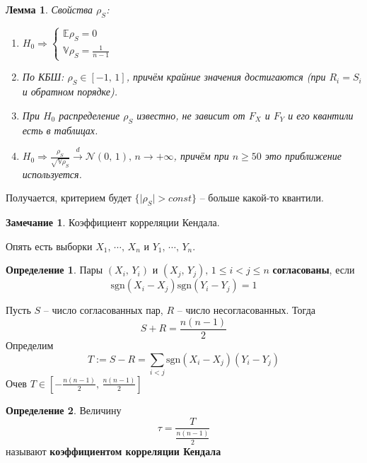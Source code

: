 \documentclass[a4paper,12pt]{article}
\renewcommand{\leq}{\ensuremath{\leqslant}}
\renewcommand{\geq}{\ensuremath{\geqslant}}
\theoremstyle{plain}
\newtheorem{lemma}{Лемма}[section]
\theoremstyle{definition}
\newtheorem{definition}{Определение}[section]
\newtheorem*{note}{Замечание}
\theoremstyle{remark}
\begin{document}
\begin{lemma}
  Свойства $\rho_S$:
  \begin{enumerate}
    \item $H_0 \Rightarrow \begin{cases}
      \mathbb{E}\rho_S = 0\\
      \mathbb{V}\rho_S = \frac{1}{n - 1}
    \end{cases}$
    \item По КБШ: $\rho_S \in [-1,\,1]$, причём крайние значения достигаются (при $R_i = S_i$ и обратном порядке).
    \item При $H_0$ распределение $\rho_S$ известно, не зависит от $F_X$ и $F_Y$ и его квантили есть в таблицах.
    \item $H_0 \Rightarrow \frac{\rho_S}{\sqrt{\mathbb{V}\rho_S}} \overset{d}{\to} \mathcal{N}(0,\,1),\, n \to +\infty$, причём при $n \geq 50$ это приближение используется.
  \end{enumerate}
\end{lemma}

Получается, критерием будет $\{\vert \rho_S\vert > const\}$ -- больше какой-то квантили.

\begin{note}
  Коэффициент корреляции Кендала.

  Опять есть выборки $X_1,\,\cdots,\,X_n$ и $Y_1,\,\cdots,\,Y_n$.
\end{note}

\begin{definition}
  Пары $(X_i,\, Y_i)$ и $(X_j,\, Y_j),\, 1 \leq i < j \leq n$ \textbf{согласованы}, если
  \[
    \text{sgn}(X_i - X_j)\text{sgn}(Y_i - Y_j) = 1
  \]
\end{definition}

Пусть $S$ -- число согласованных пар, $R$ -- число несогласованных. Тогда
\[
  S + R = \frac{n(n - 1)}{2}
\]
Определим
\[
  T := S - R = \sum_{i < j}\text{sgn}(X_i - X_j)(Y_i - Y_j)
\]
Очев $T \in [-\frac{n(n - 1)}{2},\, \frac{n(n - 1)}{2}]$

\begin{definition}
  Величину
  \[
    \tau = \frac{T}{\frac{n(n - 1)}{2}}
  \]
  называют \textbf{коэффициентом корреляции Кендала}
\end{definition}
\end{document}
